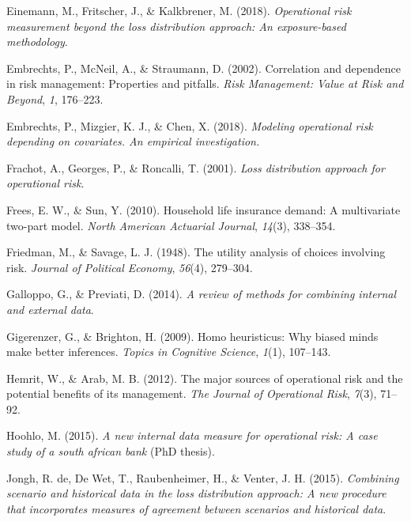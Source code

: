 \documentclass{DissertateUSU}
\begin{document}
\leavevmode\hypertarget{ref-einemann2018operational}{}%
Einemann, M., Fritscher, J., \& Kalkbrener, M. (2018). \emph{Operational
risk measurement beyond the loss distribution approach: An
exposure-based methodology}.

\leavevmode\hypertarget{ref-embrechts2002correlation}{}%
Embrechts, P., McNeil, A., \& Straumann, D. (2002). Correlation and
dependence in risk management: Properties and pitfalls. \emph{Risk
Management: Value at Risk and Beyond}, \emph{1}, 176--223.

\leavevmode\hypertarget{ref-embrechts2018modeling}{}%
Embrechts, P., Mizgier, K. J., \& Chen, X. (2018). \emph{Modeling
operational risk depending on covariates. An empirical investigation.}

\leavevmode\hypertarget{ref-frachot2001loss}{}%
Frachot, A., Georges, P., \& Roncalli, T. (2001). \emph{Loss
distribution approach for operational risk}.

\leavevmode\hypertarget{ref-frees2010household}{}%
Frees, E. W., \& Sun, Y. (2010). Household life insurance demand: A
multivariate two-part model. \emph{North American Actuarial Journal},
\emph{14}(3), 338--354.

\leavevmode\hypertarget{ref-friedman1948utility}{}%
Friedman, M., \& Savage, L. J. (1948). The utility analysis of choices
involving risk. \emph{Journal of Political Economy}, \emph{56}(4),
279--304.

\leavevmode\hypertarget{ref-galloppo2014review}{}%
Galloppo, G., \& Previati, D. (2014). \emph{A review of methods for
combining internal and external data}.

\leavevmode\hypertarget{ref-gigerenzer2009homo}{}%
Gigerenzer, G., \& Brighton, H. (2009). Homo heuristicus: Why biased
minds make better inferences. \emph{Topics in Cognitive Science},
\emph{1}(1), 107--143.

\leavevmode\hypertarget{ref-hemrit2012major}{}%
Hemrit, W., \& Arab, M. B. (2012). The major sources of operational risk
and the potential benefits of its management. \emph{The Journal of
Operational Risk}, \emph{7}(3), 71--92.

\leavevmode\hypertarget{ref-hoohlo2015new}{}%
Hoohlo, M. (2015). \emph{A new internal data measure for operational
risk: A case study of a south african bank} (PhD thesis).

\leavevmode\hypertarget{ref-de2015combining}{}%
Jongh, R. de, De Wet, T., Raubenheimer, H., \& Venter, J. H. (2015).
\emph{Combining scenario and historical data in the loss distribution
approach: A new procedure that incorporates measures of agreement
between scenarios and historical data}.
\end{document}
